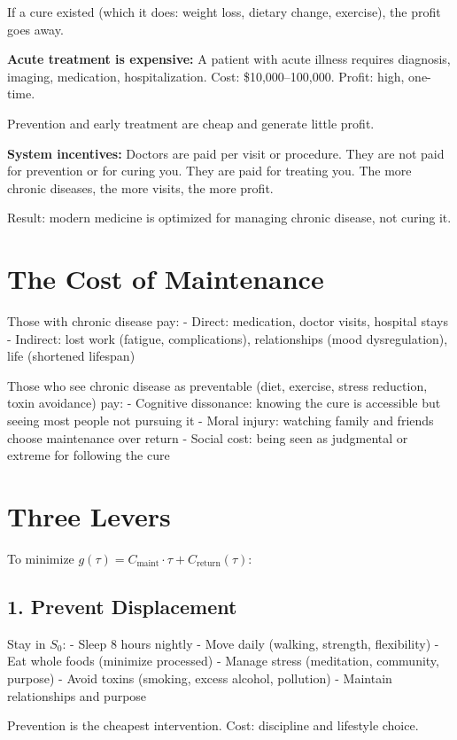 \documentclass[12pt]{article}
\begin{document}
If a cure existed (which it does: weight loss, dietary change, exercise), the profit goes away.

\textbf{Acute treatment is expensive:} A patient with acute illness requires diagnosis, imaging, medication, hospitalization. Cost: \$10,000–100,000. Profit: high, one-time.

Prevention and early treatment are cheap and generate little profit.

\textbf{System incentives:} Doctors are paid per visit or procedure. They are not paid for prevention or for curing you. They are paid for treating you. The more chronic diseases, the more visits, the more profit.

Result: modern medicine is optimized for managing chronic disease, not curing it.

\section{The Cost of Maintenance}

Those with chronic disease pay:
- Direct: medication, doctor visits, hospital stays
- Indirect: lost work (fatigue, complications), relationships (mood dysregulation), life (shortened lifespan)

Those who see chronic disease as preventable (diet, exercise, stress reduction, toxin avoidance) pay:
- Cognitive dissonance: knowing the cure is accessible but seeing most people not pursuing it
- Moral injury: watching family and friends choose maintenance over return
- Social cost: being seen as judgmental or extreme for following the cure

\section{Three Levers}

To minimize $g(\tau) = C_{\text{maint}} \cdot \tau + C_{\text{return}}(\tau)$:

\subsection{1. Prevent Displacement}

Stay in $S_0$:
- Sleep 8 hours nightly
- Move daily (walking, strength, flexibility)
- Eat whole foods (minimize processed)
- Manage stress (meditation, community, purpose)
- Avoid toxins (smoking, excess alcohol, pollution)
- Maintain relationships and purpose

Prevention is the cheapest intervention. Cost: discipline and lifestyle choice.
\end{document}
